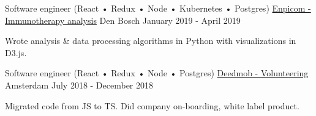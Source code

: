 \begin{cventries}
  \cventry
    {Software engineer (React • Redux • Node • Kubernetes • Postgres)}
    {\href{https://www.enpicom.com}{Enpicom - Immunotherapy analysis}}
    {Den Bosch}
    {January 2019 - April 2019}
     {
      \begin{cvitems}
        \item {Wrote analysis \& data processing algorithms in Python with visualizations in D3.js.}
      \end{cvitems}
    }

  \cventry
    {Software engineer (React • Redux • Node • Postgres)}
    {\href{https://www.deedmob.com}{Deedmob - Volunteering}}
    {Amsterdam}
    {July 2018 - December 2018}
     {
      \begin{cvitems}
        \item {Migrated code from JS to TS. Did company on-boarding, white label product.}
      \end{cvitems}
    }

\end{cventries}
